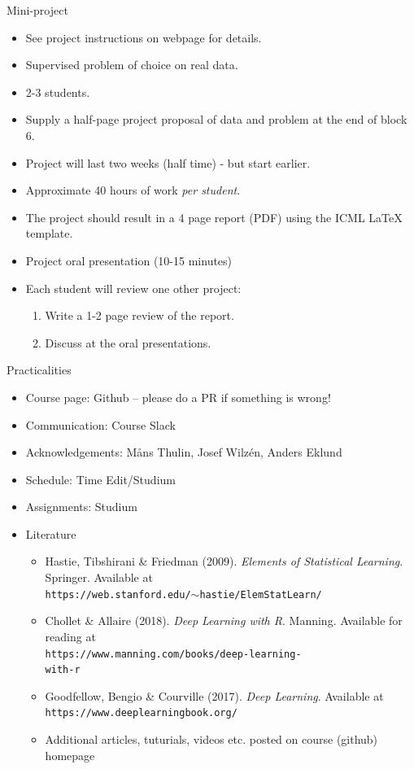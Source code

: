 \documentclass[10pt,handout]{beamer}
\begin{document}
\begin{frame}{Mini-project}

\begin{itemize}
\item See project instructions on webpage for details.\pause
\item Supervised problem of choice on real data.
\item 2-3 students.\pause
\item Supply a half-page project proposal of data and problem at the end of block 6.\pause
\item Project will last two weeks (half time) - but start earlier.
\item Approximate 40 hours of work \emph{per student}.\pause
\item The project should result in a 4 page report (PDF) using the ICML LaTeX template.
\item Project oral presentation (10-15 minutes)\pause
\item Each student will review one other project:
\begin{enumerate}
\item Write a 1-2 page review of the report.
\item Discuss at the oral presentations.
\end{enumerate}
\end{itemize}
\end{frame}


\begin{frame}{Practicalities}

\begin{itemize}
\item Course page: Github -- please do a PR if something is wrong!\pause
\item Communication: Course Slack\pause
\item Acknowledgements: M{\aa}ns Thulin, Josef Wilzén, Anders Eklund\pause
\item Schedule: Time Edit/Studium
\item Assignments: Studium\pause
\item Literature
\begin{itemize}
\item Hastie, Tibshirani \& Friedman (2009). \emph{Elements of Statistical Learning}. Springer. Available at\\\texttt{https://web.stanford.edu/$\sim$hastie/ElemStatLearn/}
\item Chollet \& Allaire (2018). \emph{Deep Learning with R}. Manning. Available for reading at\\\texttt{https://www.manning.com/books/deep-learning-\\with-r}
\item Goodfellow, Bengio \& Courville (2017). \emph{Deep Learning}. Available at \\\texttt{https://www.deeplearningbook.org/}
\item Additional articles, tuturials, videos etc. posted on course (github) homepage
\end{itemize}
\end{itemize}

\end{frame}
\end{document}
